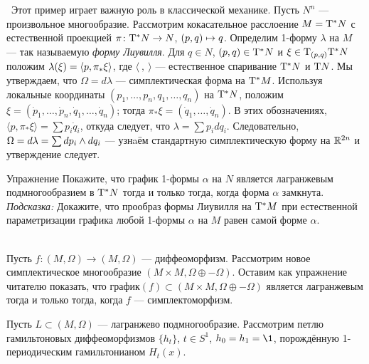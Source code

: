 \begin{ex}{}\label{3.1.C}\ 
Этот пример играет важную роль в классической механике.
Пусть $N^n$ — произвольное многообразие.
Рассмотрим кокасательное расслоение $M \z= \T^\ast N$ с естественной
проекцией $\pi\colon \mathrm{T}^\ast N \to N$, $(p, q) \z\mapsto q$.
Определим 1-форму $\lambda$ на $M$ — так называемую \emph{форму Лиувилля}.
Для $q \in N$, $(p, q) \in \mathrm{T}^\ast N$ и $\xi \in \mathrm{T}_{(p, q)} \mathrm{T}^\ast
N$ положим $\lambda (\xi) \z= \langle p, \pi_\ast \xi \rangle$, где
$\langle\ ,\ \rangle$ — естественное спаривание $\mathrm{T}^\ast N$ и $\mathrm{T} N$. 
Мы утверждаем, что $\Omega = d\lambda$ — симплектическая форма на $\mathrm{T}^\ast M$.
Используя локальные координаты $(p_1,\dots, p_n, q_1,\dots, q_n)$ на
$\mathrm{T}^\ast N$, положим $\xi = (\dot p_1 ,\dots, \dot p_n, \dot
q_1,\dots,\dot q_n)$; 
тогда $\pi_\ast \xi = (\dot q_1,\dots, \dot q_n)$.
В этих обозначениях, $\langle p, \pi_\ast \xi\rangle=\sum p_i \dot
q_i$, откуда следует, что $\lambda=\sum p_i dq_i$.
Следовательно, $\Omega = d\lambda =\sum dp_i \z\wedge dq_i$ — узнaём
стандартную симплектическую форму на $\mathbb{R}^{2n}$ и утверждение
следует. 
\end{ex}


\begin{ex*}{Упражнение}\label{1-form-lagrange}
Покажите, что график 1-формы $\alpha$ на $N$ является лагранжевым
подмногообразием в $\mathrm{T}^\ast N$ тогда и только тогда, когда форма
$\alpha$ замкнута. 
\noindent\textit{Подсказка:} Докажите, что прообраз формы Лиувилля на
$\mathrm{T}^\ast M$ при естественной параметризации графика любой 1-формы
$\alpha$ на $M$ равен самой форме $\alpha$.
\end{ex*}


\begin{ex}{}\label{3.1.D}\\ 
Пусть $f\colon (M, \Omega) \to (M, \Omega)$ — диффеоморфизм.
Рассмотрим новое симплектическое многообразие $(M \times M, \Omega \oplus -\Omega)$.
Оставим как упражнение читателю показать, что график$(f) \subset (M \times M, \Omega \oplus -\Omega)$ является лагранжевым тогда и только тогда, когда $f$ — симплектоморфизм.
\end{ex}

\begin{ex}[Лагранжева надстройка.]{}\label{3.1.E}
Пусть $L\subset(M,\Omega)$ — лагранжево подмногообразие.
Рассмотрим петлю гамильтоновых диффеоморфизмов $\{h_t\}$, $t\in S^1$,
$h_0=h_1=\1$, порождённую 1-периодическим гамильтонианом
$H_{t}(x)$. 
\end{ex}

